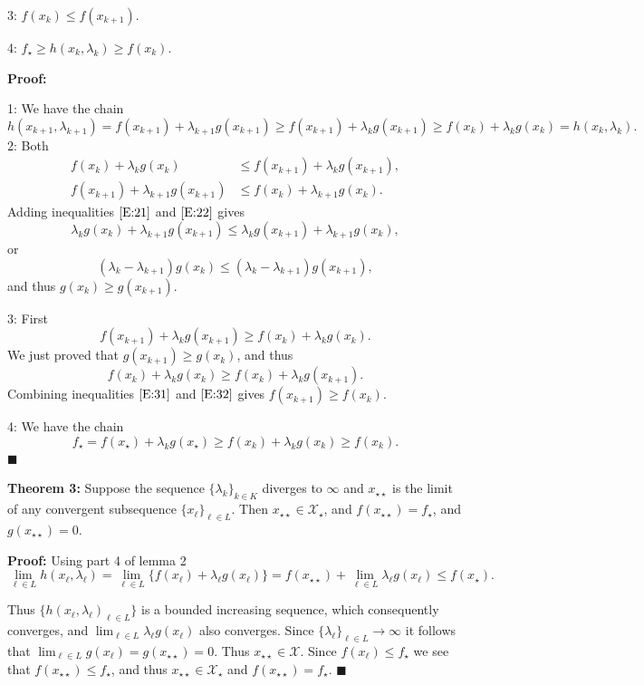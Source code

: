 \documentclass[
  12pt,
]{article}
\begin{document}
3: \(f(x_k)\leq f(x_{k+1})\).

4: \(f_\star\geq h(x_k,\lambda_k)\geq f(x_k)\).

\textbf{Proof:}

1: We have the chain \[
h(x_{k+1},\lambda_{k+1})=f(x_{k+1})+\lambda_{k+1} g(x_{k+1})\geq f(x_{k+1})+\lambda_{k} g(x_{k+1})\geq f(x_{k})+\lambda_{k}g(x_k)=h(x_k,\lambda_k).
\] 2: Both \begin{align}
f(x_k)+\lambda_k g(x_k)&\leq f(x_{k+1})+\lambda_k g(x_{k+1}),\label{E:21}\\
f(x_{k+1})+\lambda_{k+1} g(x_{k+1})&\leq f(x_k)+\lambda_{k+1} g(x_k).\label{E:22}
\end{align} Adding inequalities \(\eqref{E:21}\) and \(\eqref{E:22}\)
gives \[
\lambda_k g(x_k)+\lambda_{k+1} g(x_{k+1})\leq\lambda_k g(x_{k+1})+\lambda_{k+1} g(x_k),
\] or \[
(\lambda_k-\lambda_{k+1})g(x_k)\leq(\lambda_k-\lambda_{k+1})g(x_{k+1}),
\] and thus \(g(x_k)\geq g(x_{k+1})\).

3: First \begin{equation}\label{E:31}
f(x_{k+1})+\lambda_k g(x_{k+1})\geq f(x_k)+\lambda_k g(x_k).
\end{equation} We just proved that \(g(x_{k+1})\geq g(x_k)\), and thus
\begin{equation}\label{E:32}
f(x_k)+\lambda_k g(x_k)\geq f(x_k)+\lambda_k g(x_{k+1}).
\end{equation} Combining inequalities \(\eqref{E:31}\) and
\(\eqref{E:32}\) gives \(f(x_{k+1})\geq f(x_k)\).

4: We have the chain \[
f_\star=f(x_\star)+\lambda_k g(x_\star)\geq f(x_k)+\lambda_k g(x_k)\geq f(x_k).
\] \(\blacksquare\)

\textbf{Theorem 3: } Suppose the sequence \(\{\lambda_k\}_{k\in K}\)
diverges to \(\infty\) and \(x_{\star\star}\) is the limit of any
convergent subsequence \(\{x_\ell\}_{\ell\in L}\). Then
\(x_{\star\star}\in\mathcal{X}_\star\), and
\(f(x_{\star\star})=f_\star\), and \(g(x_{\star\star})=0\).

\textbf{Proof:} Using part 4 of lemma 2 \[
\lim_{\ell\in L}h(x_\ell,\lambda_\ell)=\lim_{\ell\in L}\{f(x_\ell)+\lambda_\ell g(x_\ell)\}=f(x_{\star\star})+\lim_{\ell\in L}\lambda_\ell g(x_\ell)\leq f(x_\star).
\]

Thus \(\{h(x_\ell,\lambda_\ell)_{\ell\in L}\}\) is a bounded increasing
sequence, which consequently converges, and
\(\lim_{\ell\in L}\lambda_\ell g(x_\ell)\) also converges. Since
\(\{\lambda_\ell\}_{\ell\in L}\rightarrow\infty\) it follows that
\(\lim_{\ell\in L}g(x_\ell)=g(x_{\star\star})=0\). Thus
\(x_{\star\star}\in\mathcal{X}\). Since \(f(x_\ell)\leq f_\star\) we see
that \(f(x_{\star\star})\leq f_\star\), and thus
\(x_{\star\star}\in\mathcal{X}_\star\) and
\(f(x_{\star\star})=f_\star\). \(\blacksquare\)
\end{document}
